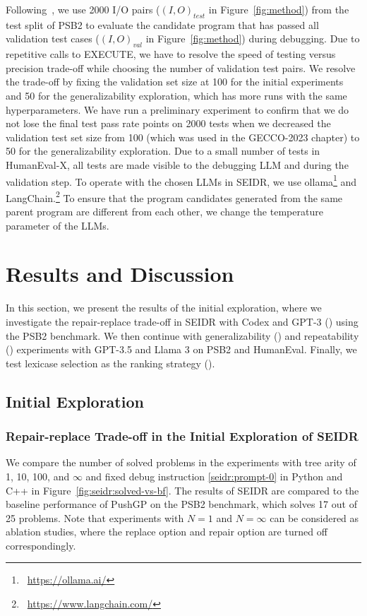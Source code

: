 Following~\cite{psb2}, we use 2000 I/O pairs ($\left(I, O\right)_{test}$ in Figure~\ref{fig:method}) from the test split of PSB2 to evaluate the candidate program that has passed all validation test cases ($\left(I, O\right)_{val}$ in Figure~\ref{fig:method}) during debugging. 
Due to repetitive calls to EXECUTE, we have to resolve the speed of testing versus precision trade-off while choosing the number of validation test pairs.
We resolve the trade-off by fixing the validation set size at 100 for the initial experiments and 50 for the generalizability exploration, which has more runs with the same hyperparameters. 
We have run a preliminary experiment to confirm that we do not lose the final test pass rate points on 2000 tests when we decreased the validation test set size from 100 (which was used in the GECCO-2023  chapter) to 50 for the generalizability exploration.
Due to a small number of tests in HumanEval-X, all tests are made visible to the debugging LLM and during the validation step.  
To operate with the chosen LLMs in SEIDR, we use ollama\footnote{~\url{https://ollama.ai/}} and LangChain.\footnote{~\url{https://www.langchain.com/}}  
To ensure that the program candidates generated from the same parent program are different from each other, we change the temperature parameter of the LLMs. 
 

\section{Results and Discussion}
\label{sec:seidr-results}

In this section, we present the results of the initial exploration, where we investigate the repair-replace trade-off in SEIDR with Codex and GPT-3 (\rqtreearity{}) using the PSB2 benchmark.
We then continue with generalizability (\rqllama{}) and repeatability (\rqmultirun{}) experiments with GPT-3.5 and Llama 3 on PSB2 and HumanEval.
Finally, we test lexicase selection as the ranking strategy (\rqlexicase{}).

\subsection{Initial Exploration}

\subsubsection{Repair-replace Trade-off in the Initial Exploration of SEIDR}
\label{sec:seidr-seidr:rqtreearity}
We compare the number of solved problems in the experiments with tree arity of 1, 10, 100, and $\infty$ and fixed debug instruction \ref{seidr:prompt-0} in Python and C++ in Figure~\ref{fig:seidr:solved-vs-bf}. 
The results of SEIDR are compared to the baseline performance of PushGP on the PSB2 benchmark, which solves 17 out of 25 problems. 
Note that experiments with $N=1$ and $N=\infty$ can be considered as ablation studies, where the replace option and repair option are turned off correspondingly. 

